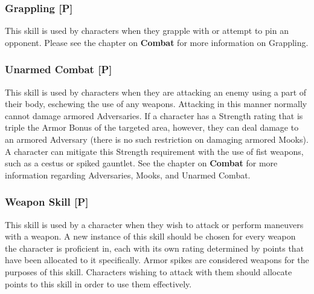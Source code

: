\documentclass[oneside]{book}
\newcommand{\comment}[1]{}
\begin{document}
\begin{multicols}{2}
\subsubsection{Grappling [P]}
This skill is used by characters when they grapple with or attempt to pin an opponent. Please see the chapter on \textbf{Combat} for more information on Grappling.

\comment{\subsubsection{Tactics [M]}
This skill is for characters who wish to direct their ally's actions on the battlefield, informing them how best to defeat their enemies in any situation. Whenever two or more allies are in combat with a specific enemy, a character may use their combat turn to make a check against their Tactics skill. Based on their level of success, each ally in combat with that specific enemy at the time of this check receive a bonus on their next turn on any resolution checks involving combat with that enemy. This bonus is lost at the end of the Tactician's next turn. Bonuses from multiple Tactics checks do not stack; instead, the bonus with the highest magnitude should be used. The magnitude of this bonus ranges from +1 to +4, for Green through Black successes respectively. 
}

\subsubsection{Unarmed Combat [P]}
This skill is used by characters when they are attacking an enemy using a part of their body, eschewing the use of any weapons. Attacking in this manner normally cannot damage armored Adversaries. If a character has a Strength rating that is triple the Armor Bonus of the targeted area, however, they can deal damage to an armored Adversary (there is no such restriction on damaging armored Mooks). A character can mitigate this Strength requirement with the use of fist weapons, such as a cestus or spiked gauntlet. See the chapter on \textbf{Combat} for more information regarding Adversaries, Mooks, and Unarmed Combat. 

\subsubsection{Weapon Skill [P]}
This skill is used by a character when they wish to attack or perform maneuvers with a weapon. A new instance of this skill should be chosen for every weapon the character is proficient in, each with its own rating determined by points that have been allocated to it specifically. Armor spikes are considered weapons for the purposes of this skill. Characters wishing to attack with them should allocate points to this skill in order to use them effectively.


\end{multicols}
\end{document}
